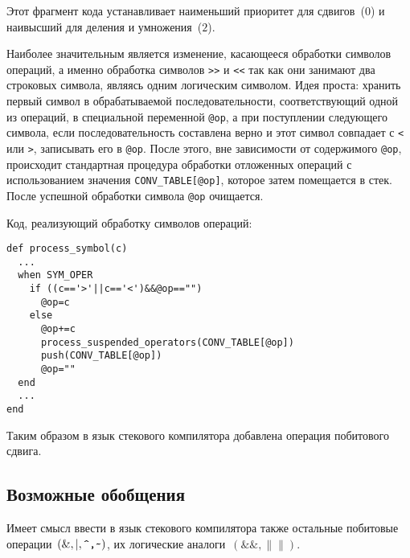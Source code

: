 Этот фрагмент кода устанавливает наименьший приоритет для сдвигов~($0$) и наивысший для
деления и умножения~($2$).

Наиболее значительным является изменение, касающееся обработки символов операций,
а именно обработка символов \verb|>>| и \verb|<<| так как они занимают два
строковых символа, являясь одним логическим символом. Идея проста: хранить первый символ в обрабатываемой последовательности, соответствующий одной из операций, в специальной переменной \verb|@op|, а при поступлении следующего символа, если последовательность составлена верно и этот символ совпадает с
\verb|<| или \verb|>|, записывать его в \verb|@op|. После этого, вне зависимости
от содержимого \verb|@op|, происходит стандартная процедура обработки отложенных
операций с использованием значения \verb|CONV_TABLE[@op]|, которое затем
помещается в стек. После успешной обработки символа \verb|@op| очищается.

\newpage

Код, реализующий обработку символов операций:
\begin{lstlisting}
def process_symbol(c)
  ...
  when SYM_OPER
    if ((c=='>'||c=='<')&&@op=="")
      @op=c
    else
      @op+=c
      process_suspended_operators(CONV_TABLE[@op])
      push(CONV_TABLE[@op])
      @op=""
  end
  ...
end
\end{lstlisting}

Таким образом в язык стекового компилятора добавлена операция побитового сдвига.
\subsection{Возможные обобщения}
Имеет смысл ввести в язык стекового компилятора также остальные побитовые операции~$\left(\&,|,\verb|^,~|\right)$, их логические аналоги~$\left(\&\&,\|\|\right)$.
